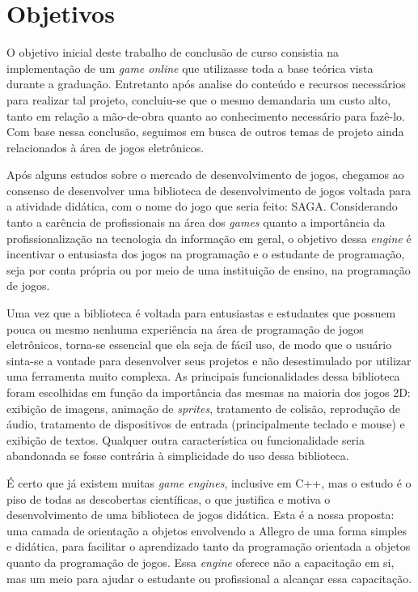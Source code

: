 \section{Objetivos}
\label{section:objetivos}

O objetivo inicial deste trabalho de conclusão de curso consistia na implementação de um \textit{game online} que utilizasse toda a base teórica vista durante a graduação. Entretanto após analise do conteúdo e recursos necessários para realizar tal projeto, concluiu-se que o mesmo demandaria um custo alto, tanto em relação a mão-de-obra quanto ao conhecimento necessário para fazê-lo. Com base nessa conclusão, seguimos em busca de outros temas de projeto ainda relacionados à área de jogos eletrônicos.

Após alguns estudos sobre o mercado de desenvolvimento de jogos, chegamos ao consenso de desenvolver uma biblioteca de desenvolvimento de jogos voltada para a atividade didática, com o nome do jogo que seria feito: SAGA. Considerando tanto a carência de profissionais na área dos \textit{games} quanto a importância da profissionalização na tecnologia da informação em geral, o objetivo dessa \textit{engine} é incentivar o entusiasta dos jogos na programação e o estudante de programação, seja por conta própria ou por meio de uma instituição de ensino, na programação de jogos. 

Uma vez que a biblioteca é voltada para entusiastas e estudantes que possuem pouca ou mesmo nenhuma experiência na área de programação de jogos eletrônicos, torna-se essencial que ela seja de fácil uso, de modo que o usuário sinta-se a vontade para desenvolver seus projetos e não desestimulado por utilizar uma ferramenta muito complexa. As principais funcionalidades dessa biblioteca foram escolhidas em função da importância das mesmas na maioria dos jogos 2D: exibição de imagens, animação de \textit{sprites}, tratamento de colisão, reprodução de áudio, tratamento de dispositivos de entrada (principalmente teclado e mouse) e exibição de textos. Qualquer outra característica ou funcionalidade seria abandonada se fosse contrária à simplicidade do uso dessa biblioteca.
%
\par 
É certo que já existem muitas \textit{game engines}, inclusive em C++, mas o estudo é o piso de todas as descobertas científicas, o que justifica e motiva o desenvolvimento de uma biblioteca de jogos didática. Esta é a nossa proposta: uma camada de orientação a objetos envolvendo a Allegro de uma forma simples e didática, para facilitar o aprendizado tanto da programação orientada a objetos quanto da programação de jogos. Essa \textit{engine} oferece não a capacitação em si, mas um meio para ajudar o estudante ou profissional a alcançar essa capacitação.
%
%
%

